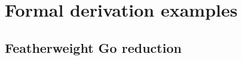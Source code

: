 \section{Formal derivation examples}

\subsection{Featherweight Go reduction}
\label{sec:fg-derivation-example}


